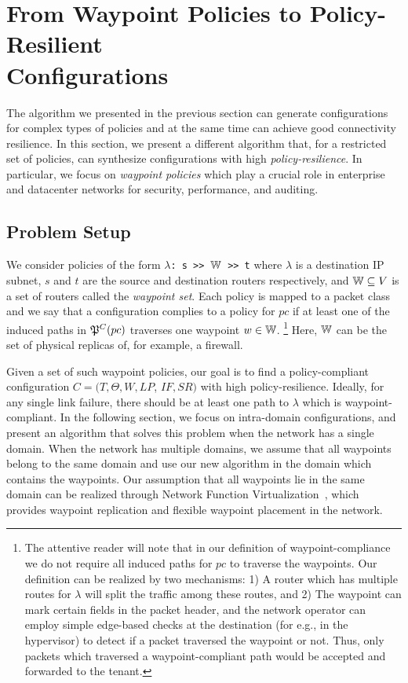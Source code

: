 \section{From Waypoint Policies to Policy-Resilient \\ Configurations}
\label{sec:waypointres}


The algorithm we presented in the previous section can generate configurations
for complex types of policies and at the same time can achieve good
connectivity resilience.
In this section, we present a different algorithm that, for a restricted set of policies,
can synthesize configurations with high \emph{policy-resilience}.
In particular, we focus on \emph{waypoint policies}
which play a crucial role in enterprise and
datacenter networks for security, performance,  
and auditing.

\subsection{Problem Setup}

We consider policies of the form 
\texttt{$\lambda$: s >> $\mathbb{W}$ >> t}
where $\lambda$ is a destination IP subnet,  
$s$ and $t$ are the source and destination routers respectively, 
and $\mathbb{W} \subseteq V$ is a set of routers called the \emph{waypoint set}. 
Each policy is mapped to a packet class and
we say that a configuration complies to a policy for $pc$ if 
at least one of the induced paths in $\mathfrak{P}^C(pc)$ 
traverses one waypoint $w \in \mathbb{W}$.
\footnote{
The attentive reader will note that in our definition of waypoint-compliance 
we do not require all induced paths for $pc$ to traverse the waypoints. 
Our definition can be realized by two mechanisms: 1) A router
which has multiple routes for $\lambda$ will split the traffic
among these routes, and 2) The waypoint can mark certain fields in
the packet header, and the network operator can employ 
simple edge-based checks at the destination 
(for e.g., in the hypervisor) to 
detect if a packet traversed the waypoint or not. Thus, only
packets which traversed a waypoint-compliant path would be 
accepted and forwarded to the tenant. 
}
Here, $\mathbb{W}$
can be the set of physical replicas of,  for example, a firewall.


 Given a set of such waypoint policies, our goal is to
find a policy-compliant configuration 
$C=(T,\Theta,W,LP$, $IF,SR)$ 
with high policy-resilience. Ideally, for 
any single link failure, there should be at least 
one path to $\lambda$ which is waypoint-compliant. 
In the following section, we focus on 
intra-domain configurations,
and present an algorithm
that solves this problem when the network 
has a single domain.
When the network has multiple domains, 
we assume that all waypoints
belong to the same domain and
use our new algorithm in the domain 
which contains the waypoints.  
Our assumption that all waypoints lie in the 
same domain can be realized
through Network Function Virtualization~\cite{opennf, netbricks},
which provides waypoint replication and 
 flexible waypoint placement in the network.


